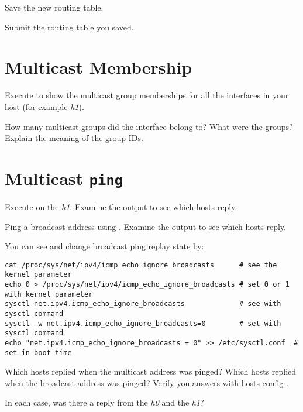 \documentclass{../UTNetLab}
\begin{document}
    Save the new routing table.
    
    \begin{report}
        \item Submit the routing table you saved.
    \end{report}

\section{Multicast Membership}
    Execute  to show the multicast group memberships for all the interfaces in your host (for example \textit{h1}).
    
    \begin{report}
        \item How many multicast groups did the interface belong to? What were the groups? Explain the meaning of the group IDs.
    \end{report}

\section{Multicast \texttt{ping}}
    Execute  on the \textit{h1}.
    Examine the  output to see which hosts reply.

    Ping a broadcast address using .
    Examine the  output to see which hosts reply.

    You can see and change broadcast ping replay state by:
    \begin{lstlisting}[emph=eth0]
cat /proc/sys/net/ipv4/icmp_echo_ignore_broadcasts      # see the kernel parameter
echo 0 > /proc/sys/net/ipv4/icmp_echo_ignore_broadcasts # set 0 or 1 with kernel parameter
sysctl net.ipv4.icmp_echo_ignore_broadcasts             # see with sysctl command
sysctl -w net.ipv4.icmp_echo_ignore_broadcasts=0        # set with sysctl command
echo "net.ipv4.icmp_echo_ignore_broadcasts = 0" >> /etc/sysctl.conf  # set in boot time
    \end{lstlisting}
    
    \begin{report}
        \item Which hosts replied when the multicast address was pinged?
            Which hosts replied when the broadcast address was pinged?
            Verify you answers with hosts config .

        \item In each case, was there a reply from the \textit{h0} and the \textit{h1}?
    \end{report}
\end{document}
